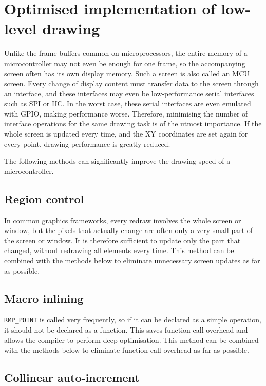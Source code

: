\section{Optimised implementation of low-level drawing}

Unlike the frame buffers common on microprocessors, the entire memory of a microcontroller may not even be enough for one frame, so the accompanying screen often has its own display memory.
Such a screen is also called an MCU screen.
Every change of display content must transfer data to the screen through an interface, and these interfaces may even be low-performance serial interfaces such as SPI or IIC.
In the worst case, these serial interfaces are even emulated with GPIO, making performance worse.
Therefore, minimising the number of interface operations for the same drawing task is of the utmost importance.
If the whole screen is updated every time, and the XY coordinates are set again for every point, drawing performance is greatly reduced.

The following methods can significantly improve the drawing speed of a microcontroller.

\subsection{Region control}

In common graphics frameworks, every redraw involves the whole screen or window, but the pixels that actually change are often only a very small part of the screen or window.
It is therefore sufficient to update only the part that changed, without redrawing all elements every time.
This method can be combined with the methods below to eliminate unnecessary screen updates as far as possible.

\subsection{Macro inlining}

\texttt{RMP\_POINT} is called very frequently, so if it can be declared as a
simple operation, it should not be declared as a function.
This saves function call overhead and allows the compiler to perform deep optimisation.
This method can be combined with the methods below to eliminate function call overhead as far as possible.

\subsection{Collinear auto-increment}

